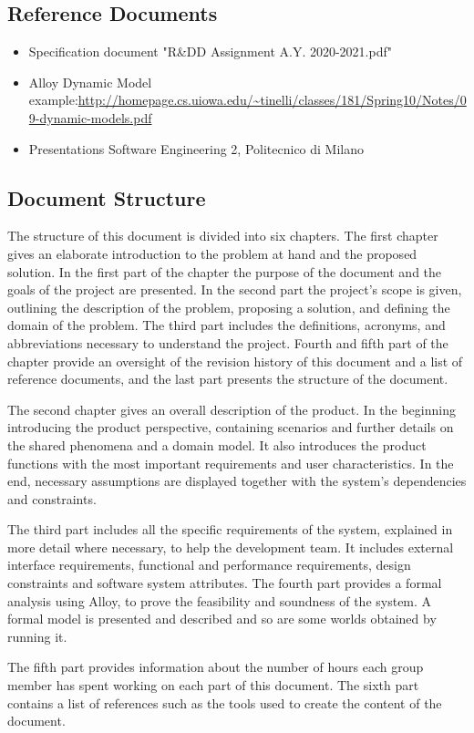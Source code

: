 \newpage
\subsection{Reference Documents}
\begin{itemize}
	\item Specification document "R\&DD Assignment A.Y. 2020-2021.pdf"
	\item Alloy Dynamic Model example:\url{http://homepage.cs.uiowa.edu/~tinelli/classes/181/Spring10/Notes/09-dynamic-models.pdf}
	\item Presentations Software Engineering 2, Politecnico di Milano
\end{itemize}

\newpage
\subsection{Document Structure}
\hspace{\parindent}The structure of this document is divided into six chapters. 
The first chapter gives an elaborate introduction to the problem at hand and the proposed solution. In the first part of the chapter the purpose of the document and the goals of the project are presented. In the second part the project's scope is given, outlining the description of the problem, proposing a solution, and defining the domain of the problem. The third part includes the definitions, acronyms, and abbreviations necessary to understand the project. Fourth and fifth part of the chapter provide an oversight of the revision history of this document and a list of reference documents, and the last part presents the structure of the document.
 
The second chapter gives an overall description of the product. In the beginning introducing the product perspective, containing scenarios and further details on the shared phenomena and a domain model. It also introduces the product functions with the most important requirements and user characteristics. In the end, necessary assumptions are displayed together with the system's dependencies and constraints.

The third part includes all the specific requirements of the system, explained in more detail where necessary, to help the development team. It includes external interface requirements, functional and performance requirements, design constraints and software system attributes. 
The fourth part provides a formal analysis using Alloy, to prove the feasibility and soundness of the system. A formal model is presented and described and so are some worlds obtained by running it. 

The fifth part provides information about the number of hours each group member has spent working on each part of this document. 
The sixth part contains a list of references such as the tools used to create the content of the document. 
